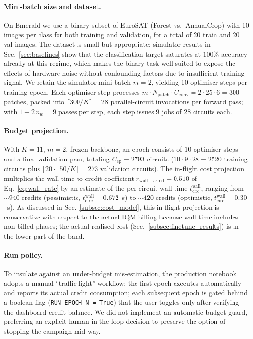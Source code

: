 \paragraph{Mini-batch size and dataset.}
On Emerald we use a binary subset of EuroSAT (Forest vs.\ AnnualCrop) with 10 images per class for both training and validation, for a total of 20 train and 20 val images. The dataset is small but appropriate: simulator results in Sec.~\ref{sec:baselines} show that the classification target saturates at $100\%$ accuracy already at this regime, which makes the binary task well-suited to expose the effects of hardware noise without confounding factors due to insufficient training signal. We retain the simulator mini-batch $m=2$, yielding 10 optimiser steps per training epoch. Each optimiser step processes $m\cdot N_{\mathrm{patch}}\cdot C_{\mathrm{conv}} = 2\cdot 25\cdot 6 = 300$ patches, packed into $\lceil 300/K\rceil = 28$ parallel-circuit invocations per forward pass; with $1+2\,n_w=9$ passes per step, each step issues 9 jobs of 28 circuits each.

\paragraph{Budget projection.}
With $K=11$, $m=2$, frozen backbone, an epoch consists of $10$ optimiser steps and a final validation pass, totaling $C_{\mathrm{ep}}\!=\!2793$ circuits ($10\cdot 9\cdot 28 = 2520$ training circuits plus $\lceil 20\cdot 150/K\rceil = 273$ validation circuits). The in-flight cost projection multiplies the wall-time-to-credit coefficient $r_{\mathrm{wall}\to\mathrm{cred}}=0.510$ of Eq.~\ref{eq:wall_rate} by an estimate of the per-circuit wall time $t_{\mathrm{circ}}^{\text{wall}}$, ranging from $\sim 940$ credits (pessimistic, $t_{\mathrm{circ}}^{\text{wall}}=0.672$~s) to $\sim 420$ credits (optimistic, $t_{\mathrm{circ}}^{\text{wall}}=0.30$~s). As discussed in Sec.~\ref{subsec:cost_model}, this in-flight projection is conservative with respect to the actual IQM billing because wall time includes non-billed phases; the actual realised cost (Sec.~\ref{subsec:finetune_results}) is in the lower part of the band.

\paragraph{Run policy.}
To insulate against an under-budget mis-estimation, the production notebook adopts a manual ``traffic-light'' workflow: the first epoch executes automatically and reports its actual credit consumption; each subsequent epoch is gated behind a boolean flag (\texttt{RUN\_EPOCH\_N\,=\,True}) that the user toggles only after verifying the dashboard credit balance. We did not implement an automatic budget guard, preferring an explicit human-in-the-loop decision to preserve the option of stopping the campaign mid-way.

